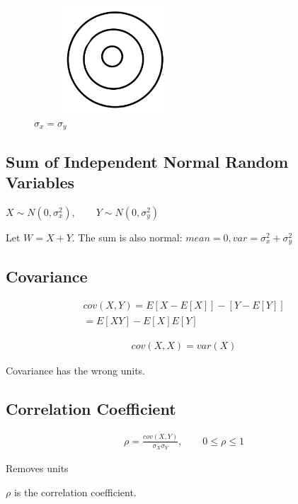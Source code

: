 \begin{figure}[h]
\centering
\includegraphics[width=6cm, height=4cm]{images/L11/percent_circle.jpeg}
\caption{$\sigma_x = \sigma_y$}
\end{figure}

\subsection{Sum of Independent Normal Random Variables}


$X \sim N(0, \sigma_x^2), \qquad Y \sim N(0, \sigma_y^2)$

Let $W=X+Y$.  The sum is also normal: $mean=0,var=\sigma_x^2 + \sigma_y^2$

\subsection{Covariance}


\begin{align}
    cov(X,Y)=E[X-E[X]] - [Y - E[Y]] \\
    = E[XY] - E[X]E[Y]
\end{align}

\begin{align*}
cov(X,X)=var(X)
\end{align*}

Covariance has the wrong units.

\subsection{Correlation Coefficient}


\begin{align}
\rho = \frac{cov(X,Y)}{\sigma_X \sigma_Y}, \qquad 0 \le \rho \le 1
\end{align}

Removes units

$\rho$ is the correlation coefficient.